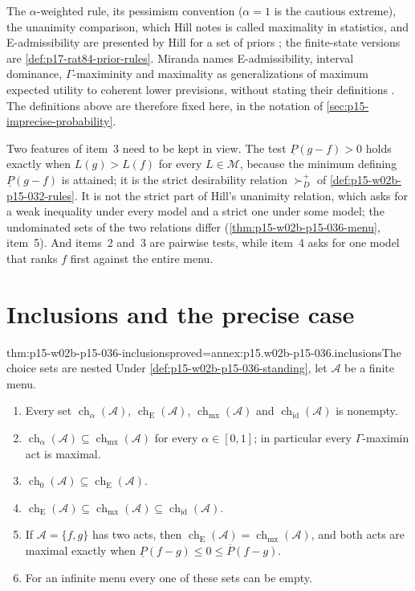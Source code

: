 The \(\alpha\)-weighted rule, its pessimism convention (\(\alpha=1\) is the
cautious extreme), the unanimity comparison, which Hill notes is called
maximality in statistics, and E-admissibility are presented by Hill for a
set of priors \cite[Sec.~2, p.~497]{Hill2021DecisionUncertainty}; the
finite-state versions are \cref{def:p17-rat84-prior-rules}. Miranda names
E-admissibility, interval dominance, \(\Gamma\)-maximinity and maximality
as generalizations of maximum expected utility to coherent lower
previsions, without stating their definitions
\cite[§6, p.~37]{MirandaCoherentLowerPrevisionsCapture}. The definitions
above are therefore fixed here, in the notation of
\cref{sec:p15-imprecise-probability}.

Two features of item~3 need to be kept in view. The test
\(\underline P(g-f)>0\) holds exactly when \(L(g)>L(f)\) for every
\(L\in\mathcal M\), because the minimum defining \(\underline P(g-f)\) is
attained; it is the strict desirability relation \(\succ_D^+\) of
\cref{def:p15-w02b-p15-032-rules}. It is not the strict part of Hill's
unanimity relation, which asks for a weak inequality under every model and
a strict one under some model; the undominated sets of the two relations
differ (\cref{thm:p15-w02b-p15-036-menu}, item~5). And items~2 and~3 are
pairwise tests, while item~4 asks for one model that ranks \(f\) first
against the entire menu.

\section{Inclusions and the precise case}
\label{sec:p15-w02b-p15-036-inclusions}

\begin{hbtheorem}{thm:p15-w02b-p15-036-inclusions}{proved=annex:p15.w02b-p15-036.inclusions}{The choice sets are nested}
Under \cref{def:p15-w02b-p15-036-standing}, let \(\mathcal A\) be a finite
menu.
\begin{enumerate}
\item Every set \(\operatorname{ch}_\alpha(\mathcal A)\),
 \(\operatorname{ch}_{\mathrm E}(\mathcal A)\),
 \(\operatorname{ch}_{\mathrm{mx}}(\mathcal A)\) and
 \(\operatorname{ch}_{\mathrm{id}}(\mathcal A)\) is nonempty.
\item \(\operatorname{ch}_\alpha(\mathcal A)\subseteq
 \operatorname{ch}_{\mathrm{mx}}(\mathcal A)\) for every
 \(\alpha\in[0,1]\); in particular every \(\Gamma\)-maximin act is maximal.
\item \(\operatorname{ch}_0(\mathcal A)\subseteq
 \operatorname{ch}_{\mathrm E}(\mathcal A)\).
\item \(\operatorname{ch}_{\mathrm E}(\mathcal A)\subseteq
 \operatorname{ch}_{\mathrm{mx}}(\mathcal A)\subseteq
 \operatorname{ch}_{\mathrm{id}}(\mathcal A)\).
\item If \(\mathcal A=\{f,g\}\) has two acts, then
 \(\operatorname{ch}_{\mathrm E}(\mathcal A)=
 \operatorname{ch}_{\mathrm{mx}}(\mathcal A)\), and both acts are maximal
 exactly when \(\underline P(f-g)\leq0\leq\overline P(f-g)\).
\item For an infinite menu every one of these sets can be empty.
\end{enumerate}
\end{hbtheorem}

